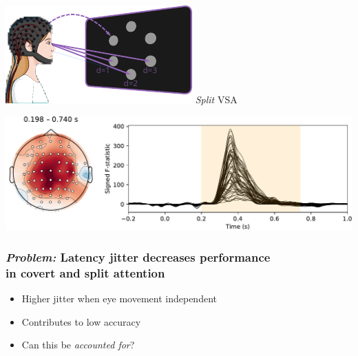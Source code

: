 \documentclass{kul-ulille-beamer}
\begin{document}
\begin{frame}
\begin{minipage}[t]{.45\textwidth}
    \includegraphics[width=.2\textwidth]{figures/covert/attention_split.pdf}
    \hspace{.5em}
    \emph{Split} VSA
    \smallskip

    \includegraphics[width=\textwidth]{figures/covert/erps/erp_split_cluster-0.pdf}

  \end{minipage}
\end{frame}




\begin{frame}[c]
  \frametitle{\emph{Problem:} Latency jitter decreases performance \\ in covert and split
  attention}
  \begin{minipage}{.4\textwidth}
    
  \end{minipage}\hfill%
  \begin{minipage}{.55\textwidth}
    \small
    \centering
    {\centering\resizebox{.7\textwidth}{!}{%
    \small

    
    }}

    \begin{itemize}
      \item Higher jitter when eye movement independent
      \item Contributes to low accuracy \\ {\tiny\cite{Arico2014}}
      \item Can this be \emph{accounted for}?
    \end{itemize}

  \end{minipage}

\end{frame}
\end{document}
